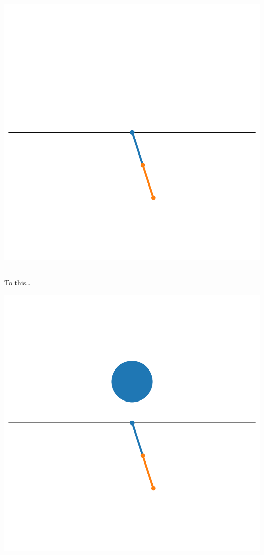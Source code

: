 \documentclass[
  letterpaper,
  DIV=11,
  numbers=noendperiod,
  oneside]{scrartcl}
\begin{document}
\begin{center}
\includegraphics{figs/anim_dip_no-obstacle.gif}
\end{center}

\subsection{}\label{section-29}

To this\ldots{}

\begin{center}
\includegraphics{figs/anim_dip.gif}
\end{center}
\end{document}
